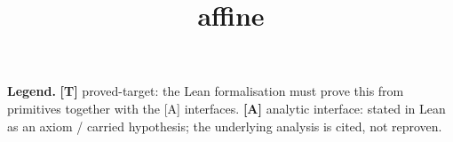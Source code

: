 \documentclass[11pt]{report}
\title{affine}
\author{}
\date{}
\begin{document}
\maketitle

\noindent\textbf{Legend.}\quad
\textbf{[T]} \textsf{proved-target}: the Lean formalisation must prove this from primitives together with
the [A] interfaces.\quad
\textbf{[A]} \textsf{analytic interface}: stated in Lean as an axiom / carried hypothesis; the underlying
analysis is cited, not reproven.

\tableofcontents


\end{document}
